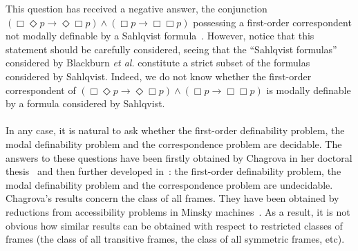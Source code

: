 \documentclass[draft]{article}
\begin{document}
This question has received a negative answer, the conjunction $(\Box\Diamond p\rightarrow\Diamond\Box p)\wedge(\Box p\rightarrow\Box\Box p)$ possessing a first-order correspondent not modally definable by a Sahlqvist formula~\cite[Chapter~$3$]{Blackburn:deRijke:Venema:2001}.
However, notice that this statement should be carefully considered, seeing that the ``Sahlqvist formulas'' considered by Blackburn {\it et al.}\/ constitute a strict subset of the formulas considered by Sahlqvist.
Indeed, we do not know whether the first-order correspondent of $(\Box\Diamond p\rightarrow\Diamond\Box p)\wedge(\Box p\rightarrow\Box\Box p)$ is modally definable by a formula considered by Sahlqvist.
%
%
\\
\\
%
%
In any case, it is natural to ask whether the first-order definability problem, the modal definability problem and the correspondence problem are decidable.
%
%
%
%
The answers to these questions have been firstly obtained by Chagrova in her doctoral thesis~\cite{Chagrova:1989} and then further developed in~\cite{Chagrov:Chagrova:1995,Chagrov:Chagrova:2006,Chagrov:Chagrova:2007,Chagrova:1991}:
%
%
%
%
%
%
%
%
%
%
the first-order definability problem, the modal definability problem and the correspondence problem are undecidable.
%
%
%
%
Chagrova's results concern the class of all frames.
They have been obtained by reductions from accessibility problems in Minsky machines~\cite{Chagrov:Chagrova:2006}.
As a result, it is not obvious how similar results can be obtained with respect to restricted classes of frames (the class of all transitive frames, the class of all symmetric frames, etc).
\end{document}
